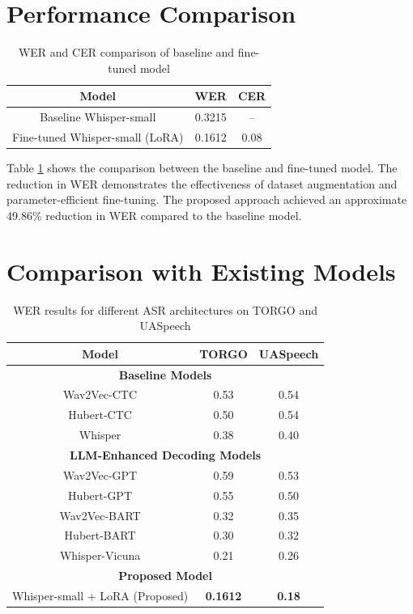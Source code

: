 \section{Performance Comparison}

\begin{table}[htb]
\centering
\fontsize{10}{12}\selectfont
\caption{WER and CER comparison of baseline and fine-tuned model}
\label{c5:tab2}
\begin{tabular}{|c|c|c|}
\hline
\textbf{Model} & \textbf{WER} & \textbf{CER} \\
\hline
Baseline Whisper-small & 0.3215 & -- \\
\hline
Fine-tuned Whisper-small (LoRA) & 0.1612 & 0.08 \\
\hline
\end{tabular}
\end{table}

Table \ref{c5:tab2} shows the comparison between the baseline and fine-tuned model. The reduction in WER demonstrates the effectiveness of dataset augmentation and parameter-efficient fine-tuning. The proposed approach achieved an approximate 49.86\% reduction in WER compared to the baseline model.

\section{Comparison with Existing Models}

\begin{table}[htb]
\centering
\fontsize{10}{12}\selectfont
\caption{WER results for different ASR architectures on TORGO and UASpeech}
\label{c5:tab3}
\begin{tabular}{|c|c|c|}
\hline
\textbf{Model} & \textbf{TORGO} & \textbf{UASpeech} \\
\hline
\multicolumn{3}{|c|}{\textbf{Baseline Models}} \\
\hline
Wav2Vec-CTC & 0.53 & 0.54 \\
Hubert-CTC & 0.50 & 0.54 \\
Whisper & 0.38 & 0.40 \\
\hline
\multicolumn{3}{|c|}{\textbf{LLM-Enhanced Decoding Models}} \\
\hline
Wav2Vec-GPT & 0.59 & 0.53 \\
Hubert-GPT & 0.55 & 0.50 \\
Wav2Vec-BART & 0.32 & 0.35 \\
Hubert-BART & 0.30 & 0.32 \\
Whisper-Vicuna & 0.21 & 0.26 \\
\hline
\multicolumn{3}{|c|}{\textbf{Proposed Model}} \\
\hline
Whisper-small + LoRA (Proposed) & \textbf{0.1612} & \textbf{0.18} \\
\hline
\end{tabular}
\end{table}

